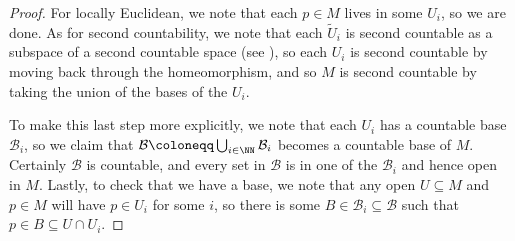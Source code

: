 \documentclass[../notes.tex]{subfiles}
\begin{document}
\begin{proof}
	For locally Euclidean, we note that each $p\in M$ lives in some $U_i$, so we are done. As for second countability, we note that each $\widetilde U_i$ is second countable as a subspace of a second countable space (see ), so each $U_i$ is second countable by moving back through the homeomorphism, and so $M$ is second countable by taking the union of the bases of the $U_i$.
	
	To make this last step more explicitly, we note that each $U_i$ has a countable base $\mathcal B_i$, so we claim that $\mathcal B\coloneqq\bigcup_{i\in\NN}\mathcal B_i$ becomes a countable base of $M$. Certainly $\mathcal B$ is countable, and every set in $\mathcal B$ is in one of the $\mathcal B_i$ and hence open in $M$. Lastly, to check that we have a base, we note that any open $U\subseteq M$ and $p\in M$ will have $p\in U_i$ for some $i$, so there is some $B\in\mathcal B_i\subseteq\mathcal B$ such that $p\in B\subseteq U\cap U_i$.
\end{proof}
\end{document}
